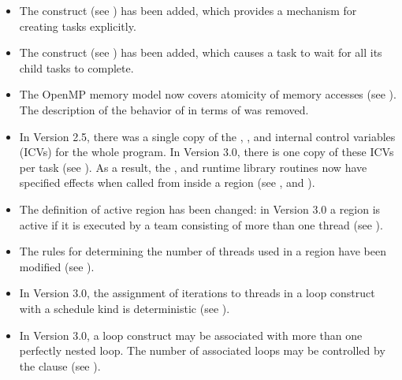 \begin{itemize}
\item The  construct (see
)
has been added, which provides
a mechanism for creating tasks explicitly.

\item The  construct (see
) has been added, which
causes a task to wait for all its child tasks to complete.

\item The OpenMP memory model now covers atomicity of memory accesses (see
).
The description of the behavior of  in terms of
 was removed.

\item In Version 2.5, there was a single copy of the , ,  and
 internal control variables (ICVs) for the whole program. In Version
3.0, there is one copy of these ICVs per task (see
). As a result,
the ,  and 
runtime library routines now have specified effects when called from inside a
 region (see
,
 and
).

\item The definition of active  region has been changed: in Version 3.0 a
 region is active if it is executed by a team consisting of more than one
thread (see
).

\item The rules for determining the number of threads used in a  region have
been modified (see
).

\item In Version 3.0, the assignment of iterations to threads in a loop construct with a
 schedule kind is deterministic (see
).

\item In Version 3.0, a loop construct may be associated with more than one perfectly
nested loop. The number of associated loops may be controlled by the 
clause (see
).


\end{itemize}
